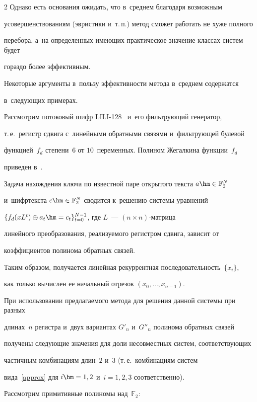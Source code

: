 \begin{multicols}{2}
Однако есть основания ожидать, что в~среднем благодаря возможным 


усовершенствованиям (эвристики и~т.\,п.) метод сможет работать не хуже полного 


перебора, а~на определенных име\-ющих практическое значение классах сис\-тем будет 


гораздо более эффективным.





Некоторые аргументы в~пользу эффективности метода в~среднем содержатся 


в~следующих примерах.


Рассмотрим потоковый шифр LILI-128~\cite{SDGM2000} и~его фильтрующий генератор, 


т.\,е.\ регистр сдвига с~линейными обратными связями и~фильтрующей булевой 


функцией~$f_d$ степени~$6$ от $10$~переменных. Полином Жегалкина функции~$f_d$ 


приведен в~\cite{Log2008,LYaD2007}.


Задача нахождения ключа по известной паре открытого текста $a\hm\in\mathbb{F}_2^N$ 


и~шифртекста $c\hm\in\mathbb{F}_2^N$ сводится к~решению системы уравнений 


$\{f_d(xL^t)\oplus a_t\hm=c_t\}_{t=0}^{N-1}$, где $L$~--- $(n\times n)$-мат\-ри\-ца 


линейного преобразования, реализуемого регистром сдвига, зависит от 


коэффициентов полинома обратных связей.


Таким образом, получается линейная рекуррентная последовательность~$\{x_i\}$, 


как только вычислен ее начальный отрезок $(x_0,\ldots,x_{n-1})$.





При использовании предлагаемого метода для решения данной системы при разных 


длинах~$n$ регистра и~двух вариантах $G'_n$ и~$G''_n$ полинома обратных связей 


получены следующие значения для доли несовместных систем, соответствующих 


частичным комбинациям длин~$2$ и~$3$ (т.\,е.\ комбинациям систем 


вида~\eqref{approx} для $i\hm=1, 2$ и~$i=1, 2, 3$ соответственно).


Рассмотрим примитивные полиномы над~$\mathbb{F}_2$:



\end{multicols}
